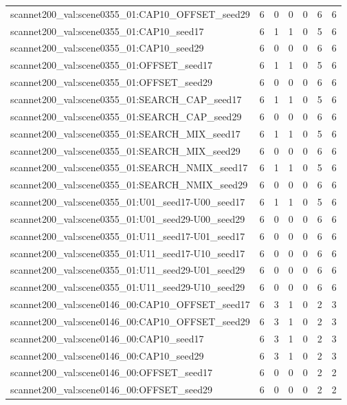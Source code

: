 \begin{table}[t]
\begin{tabular}{lrrrrrr}
scannet200\_val:scene0355\_01:CAP10\_OFFSET\_seed29 & 6 & 0 & 0 & 0 & 6 & 6 \\
scannet200\_val:scene0355\_01:CAP10\_seed17 & 6 & 1 & 1 & 0 & 5 & 6 \\
scannet200\_val:scene0355\_01:CAP10\_seed29 & 6 & 0 & 0 & 0 & 6 & 6 \\
scannet200\_val:scene0355\_01:OFFSET\_seed17 & 6 & 1 & 1 & 0 & 5 & 6 \\
scannet200\_val:scene0355\_01:OFFSET\_seed29 & 6 & 0 & 0 & 0 & 6 & 6 \\
scannet200\_val:scene0355\_01:SEARCH\_CAP\_seed17 & 6 & 1 & 1 & 0 & 5 & 6 \\
scannet200\_val:scene0355\_01:SEARCH\_CAP\_seed29 & 6 & 0 & 0 & 0 & 6 & 6 \\
scannet200\_val:scene0355\_01:SEARCH\_MIX\_seed17 & 6 & 1 & 1 & 0 & 5 & 6 \\
scannet200\_val:scene0355\_01:SEARCH\_MIX\_seed29 & 6 & 0 & 0 & 0 & 6 & 6 \\
scannet200\_val:scene0355\_01:SEARCH\_NMIX\_seed17 & 6 & 1 & 1 & 0 & 5 & 6 \\
scannet200\_val:scene0355\_01:SEARCH\_NMIX\_seed29 & 6 & 0 & 0 & 0 & 6 & 6 \\
scannet200\_val:scene0355\_01:U01\_seed17-U00\_seed17 & 6 & 1 & 1 & 0 & 5 & 6 \\
scannet200\_val:scene0355\_01:U01\_seed29-U00\_seed29 & 6 & 0 & 0 & 0 & 6 & 6 \\
scannet200\_val:scene0355\_01:U11\_seed17-U01\_seed17 & 6 & 0 & 0 & 0 & 6 & 6 \\
scannet200\_val:scene0355\_01:U11\_seed17-U10\_seed17 & 6 & 0 & 0 & 0 & 6 & 6 \\
scannet200\_val:scene0355\_01:U11\_seed29-U01\_seed29 & 6 & 0 & 0 & 0 & 6 & 6 \\
scannet200\_val:scene0355\_01:U11\_seed29-U10\_seed29 & 6 & 0 & 0 & 0 & 6 & 6 \\
scannet200\_val:scene0146\_00:CAP10\_OFFSET\_seed17 & 6 & 3 & 1 & 0 & 2 & 3 \\
scannet200\_val:scene0146\_00:CAP10\_OFFSET\_seed29 & 6 & 3 & 1 & 0 & 2 & 3 \\
scannet200\_val:scene0146\_00:CAP10\_seed17 & 6 & 3 & 1 & 0 & 2 & 3 \\
scannet200\_val:scene0146\_00:CAP10\_seed29 & 6 & 3 & 1 & 0 & 2 & 3 \\
scannet200\_val:scene0146\_00:OFFSET\_seed17 & 6 & 0 & 0 & 0 & 2 & 2 \\
scannet200\_val:scene0146\_00:OFFSET\_seed29 & 6 & 0 & 0 & 0 & 2 & 2 \\

\end{tabular}
\end{table}
